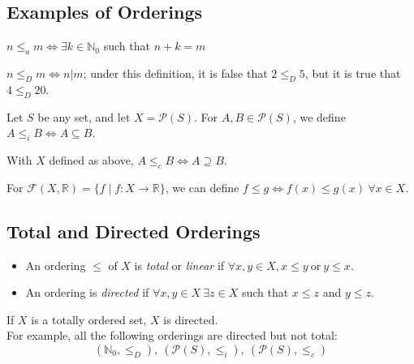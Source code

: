 \documentclass[10pt]{extarticle}
\newcommand{\N}{\mathbb{N}}
\newcommand{\R}{\mathbb{R}}
\begin{document}
    \subsection{Examples of Orderings}%
    \begin{description}[font=\normalfont]
      \item[Algebraic Ordering of $\N_0$:] $n\leq_a m\Leftrightarrow \exists k\in \N_0$ such that $n+k = m$
      \item[$\N$ ordered via division:] $n\leq_D m \Leftrightarrow n|m$; under this definition, it is false that $2\leq_D 5$, but it is true that $4\leq_D 20$.
      \item[Inclusion:] Let $S$ be any set, and let $X = \mathcal{P}(S)$. For $A,B\in \mathcal{P}(S)$, we define $A\leq_i B \Leftrightarrow A\subseteq B$.
      \item[Containment:] With $X$ defined as above, $A\leq_c B\Leftrightarrow A\supseteq B$.
      \item[Functions:] For $\mathcal{F}(X,\R) = \{f\mid f:X\rightarrow\R\}$, we can define $f\leq g\Leftrightarrow f(x)\leq g(x)~\forall x\in X$.
    \end{description}
    \subsection{Total and Directed Orderings}%
      \begin{itemize}
        \item An ordering $\leq$ of $X$ is \textsl{total} or \textit{linear} if $\forall x,y\in X, x\leq y~\text{or}~y\leq x$. 
        \item An ordering is \textsl{directed} if $\forall x,y\in X~\exists z\in X$ such that $x\leq z$ and $y\leq z$.
      \end{itemize}
      If $X$ is a totally ordered set, $X$ is directed.\\

      For example, all the following orderings are directed but not total:
      \[
        (\N_0,\leq_D),~(\mathcal{P}(S),\leq_i),~(\mathcal{P}(S),\leq_c)
      \] 
\end{document}
